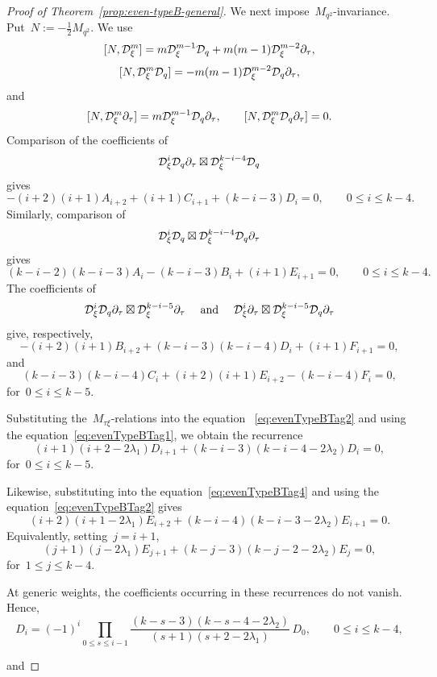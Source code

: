 \documentclass[12pt,a4paper]{amsart}
\theoremstyle{thm}
\theoremstyle{definition}
\newcommand {\Dq}{\cD_q}
\newcommand {\Dxi}{\cD_\xi}
\begin{document}
\begin{proof}[Proof of Theorem~\textup{\ref{prop:even-typeB-general}}]
We next impose~\(M_{q^2}\)-invariance. Put~$
N:=-\frac12M_{q^2}.
$ We use
\[
[N,\Dxi^m]
=
m\Dxi^{m-1}\Dq+m(m-1)\Dxi^{m-2}\partial_\tau,
\]
\[
[N,\Dxi^m\Dq]
=
-m(m-1)\Dxi^{m-2}\Dq\partial_\tau,
\]
and
\[
[N,\Dxi^m\partial_\tau]
=
m\Dxi^{m-1}\Dq\partial_\tau,
\qquad
[N,\Dxi^m\Dq\partial_\tau]=0.
\]
Comparison of the coefficients of
\[
\Dxi^i\Dq\partial_\tau\boxtimes \Dxi^{k-i-4}\Dq
\]
gives
\begin{equation}\label{eq:evenTypeBTag1}
-(i+2)(i+1)A_{i+2}
+(i+1)C_{i+1}
+(k-i-3)D_i=0,
\qquad
0\leq i\leq k-4.
\end{equation}
Similarly, comparison of
\[
\Dxi^i\Dq\boxtimes \Dxi^{k-i-4}\Dq\partial_\tau
\]
gives
\begin{equation}
    \label{eq:evenTypeBTag2}
(k-i-2)(k-i-3)A_i
-(k-i-3)B_i
+(i+1)E_{i+1}=0,
\qquad
0\leq i\leq k-4.
\end{equation}
The coefficients of
\[
\Dxi^i\Dq\partial_\tau\boxtimes \Dxi^{k-i-5}\partial_\tau
\quad \text{ and } \quad
\Dxi^i\partial_\tau\boxtimes \Dxi^{k-i-5}\Dq\partial_\tau
\]
give, respectively,
\begin{equation}\label{eq:evenTypeBTag3}
-(i+2)(i+1)B_{i+2}
+
(k-i-3)(k-i-4)D_i
+
(i+1)F_{i+1}=0,
\end{equation}
and
\begin{equation}\label{eq:evenTypeBTag4}
(k-i-3)(k-i-4)C_i
+
(i+2)(i+1)E_{i+2}
-
(k-i-4)F_i=0,
\end{equation}
for~\(0\leq i\leq k-5\).

Substituting the~\(M_{\tau\xi}\)-relations into the equation~%
\eqref{eq:evenTypeBTag2} and using the equation~\eqref{eq:evenTypeBTag1}, we obtain the recurrence
\[
(i+1)(i+2-2\lambda_1)D_{i+1}
+
(k-i-3)(k-i-4-2\lambda_2)D_i
=0,
\]
for~\(0\leq i\leq k-5\).

Likewise, substituting into the equation~\eqref{eq:evenTypeBTag4} and using the equation~\eqref{eq:evenTypeBTag2} gives
\[
(i+2)(i+1-2\lambda_1)E_{i+2}
+
(k-i-4)(k-i-3-2\lambda_2)E_{i+1}
=0.
\]
Equivalently, setting~\(j=i+1\),
\[
(j+1)(j-2\lambda_1)E_{j+1}
+
(k-j-3)(k-j-2-2\lambda_2)E_j
=0,
\]
for~\(1\leq j\leq k-4\).

At generic weights, the coefficients occurring in these recurrences
do not vanish. Hence,
\[
D_i
=
(-1)^i
\prod_{0\leq s\leq i-1}
\frac{(k-s-3)(k-s-4-2\lambda_2)}
{(s+1)(s+2-2\lambda_1)}
\,D_0,
\qquad
0\leq i\leq k-4,
\]

and


\end{proof}
\end{document}
